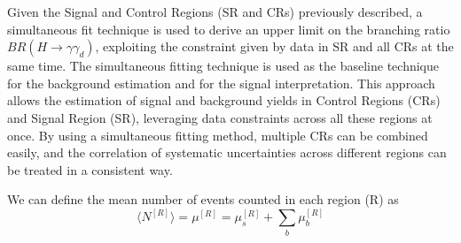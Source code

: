 Given the Signal and Control Regions (SR and CRs) previously described, a simultaneous fit technique is used to derive an upper limit on the branching ratio $BR(H\rightarrow \gamma \gamma_d)$, exploiting the constraint given by data in SR and all CRs at the same time. The simultaneous fitting technique is used as the baseline technique for the background estimation and for the signal interpretation. This approach allows the estimation of signal and background yields in Control Regions (CRs) and Signal Region (SR), leveraging data constraints across all these regions at once. By using a simultaneous fitting method, multiple CRs can be combined easily, and the correlation of systematic uncertainties across different regions can be treated in a consistent way.

We can define the mean number of events counted in each region (R) as
\begin{equation}
    \langle N^{[R]} \rangle=\mu^{[R]}=\mu_s^{[R]}+\sum_b \mu_b^{[R]}
\end{equation}

